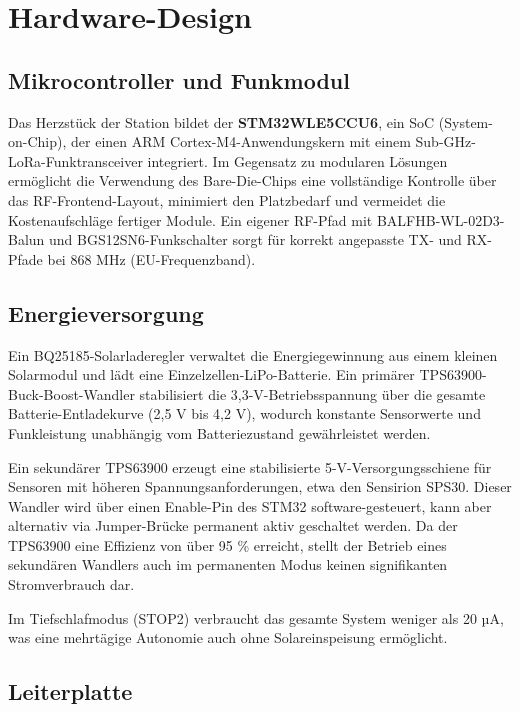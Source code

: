 \newpage
\section*{Hardware-Design}

\subsection*{Mikrocontroller und Funkmodul}

Das Herzstück der Station bildet der \textbf{STM32WLE5CCU6}, ein SoC (System-on-Chip), der einen ARM Cortex-M4-Anwendungskern mit einem Sub-GHz-LoRa-Funktransceiver integriert. Im Gegensatz zu modularen Lösungen ermöglicht die Verwendung des Bare-Die-Chips eine vollständige Kontrolle über das RF-Frontend-Layout, minimiert den Platzbedarf und vermeidet die Kostenaufschläge fertiger Module. Ein eigener RF-Pfad mit BALFHB-WL-02D3-Balun und BGS12SN6-Funkschalter sorgt für korrekt angepasste TX- und RX-Pfade bei 868 MHz (EU-Frequenzband).

\subsection*{Energieversorgung}

Ein BQ25185-Solarladeregler verwaltet die Energiegewinnung aus einem kleinen Solarmodul und lädt eine Einzelzellen-LiPo-Batterie. Ein primärer TPS63900-Buck-Boost-Wandler stabilisiert die 3,3-V-Betriebsspannung über die gesamte Batterie-Entladekurve (2,5 V bis 4,2 V), wodurch konstante Sensorwerte und Funkleistung unabhängig vom Batteriezustand gewährleistet werden.

Ein sekundärer TPS63900 erzeugt eine stabilisierte 5-V-Versorgungsschiene für Sensoren mit höheren Spannungsanforderungen, etwa den Sensirion SPS30. Dieser Wandler wird über einen Enable-Pin des STM32 software-gesteuert, kann aber alternativ via Jumper-Brücke permanent aktiv geschaltet werden. Da der TPS63900 eine Effizienz von über 95 \% erreicht, stellt der Betrieb eines sekundären Wandlers auch im permanenten Modus keinen signifikanten Stromverbrauch dar.

Im Tiefschlafmodus (STOP2) verbraucht das gesamte System weniger als 20 µA, was eine mehrtägige Autonomie auch ohne Solareinspeisung ermöglicht.

\subsection*{Leiterplatte}

